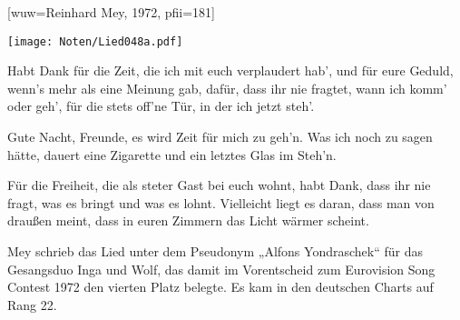 [wuw={Reinhard Mey, 1972}, pfii={181}]

\markboth{\songtitle}{\songtitle}

\beginverse
\endverse

\centering\texttt{[image: Noten/Lied048a.pdf]}	

\beginverse
Habt Dank für die Zeit, die ich mit euch verplaudert hab',
und für eure Geduld, wenn's mehr als eine Meinung gab,
dafür, dass ihr nie fragtet, wann ich komm' oder geh',
für die stets off'ne Tür, in der ich jetzt steh'.
\endverse

\beginchorus
Gute Nacht, Freunde, es wird Zeit für mich zu geh'n.
Was ich noch zu sagen hätte, dauert eine Zigarette und ein letztes Glas im Steh'n.
\endchorus

\beginverse
Für die Freiheit, die als steter Gast bei euch wohnt,
habt Dank, dass ihr nie fragt, was es bringt und was es lohnt.
Vielleicht liegt es daran, dass man von draußen meint,
dass in euren Zimmern das Licht wärmer scheint.
\endverse

\endsong

\beginscripture{}
Mey schrieb das Lied unter dem Pseudonym „Alfons Yondraschek“ für das Gesangsduo Inga und Wolf, das damit im Vorentscheid zum Eurovision Song Contest 1972 den vierten Platz belegte. Es kam in den deutschen Charts auf Rang 22.
\endscripture

\begin{intersong}

\end{intersong}
